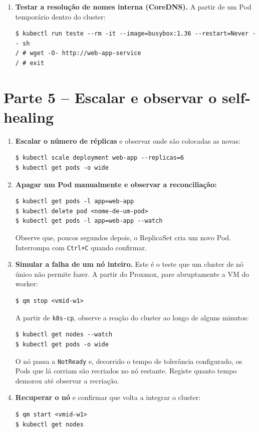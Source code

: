 \documentclass[11pt,a4paper]{article}
\begin{document}
\begin{enumerate}[label=\arabic*.,resume]
  \item \textbf{Testar a resolução de nomes interna (CoreDNS).} A partir de um Pod temporário dentro do cluster:
\begin{lstlisting}
$ kubectl run teste --rm -it --image=busybox:1.36 --restart=Never -- sh
/ # wget -O- http://web-app-service
/ # exit
\end{lstlisting}

\end{enumerate}

\section{Parte 5 -- Escalar e observar o self-healing}
\begin{enumerate}[label=\arabic*.,resume]

  \item \textbf{Escalar o número de réplicas} e observar onde são colocadas as novas:
\begin{lstlisting}
$ kubectl scale deployment web-app --replicas=6
$ kubectl get pods -o wide
\end{lstlisting}

  \item \textbf{Apagar um Pod manualmente e observar a reconciliação:}
\begin{lstlisting}
$ kubectl get pods -l app=web-app
$ kubectl delete pod <nome-de-um-pod>
$ kubectl get pods -l app=web-app --watch
\end{lstlisting}
  Observe que, poucos segundos depois, o ReplicaSet cria um novo Pod. Interrompa com \texttt{Ctrl+C} quando confirmar.

  \item \textbf{Simular a falha de um nó inteiro.} Este é o teste que um cluster de nó único não permite fazer. A partir do Proxmox, pare abruptamente a VM do worker:
\begin{lstlisting}
$ qm stop <vmid-w1>
\end{lstlisting}
  A partir de \texttt{k8s-cp}, observe a reação do cluster ao longo de alguns minutos:
\begin{lstlisting}
$ kubectl get nodes --watch
$ kubectl get pods -o wide
\end{lstlisting}
  O nó passa a \texttt{NotReady} e, decorrido o tempo de tolerância configurado, os Pods que lá corriam são recriados no nó restante. Registe quanto tempo demorou até observar a recriação.

  \item \textbf{Recuperar o nó} e confirmar que volta a integrar o cluster:
\begin{lstlisting}
$ qm start <vmid-w1>
$ kubectl get nodes
\end{lstlisting}


\end{enumerate}
\end{document}
